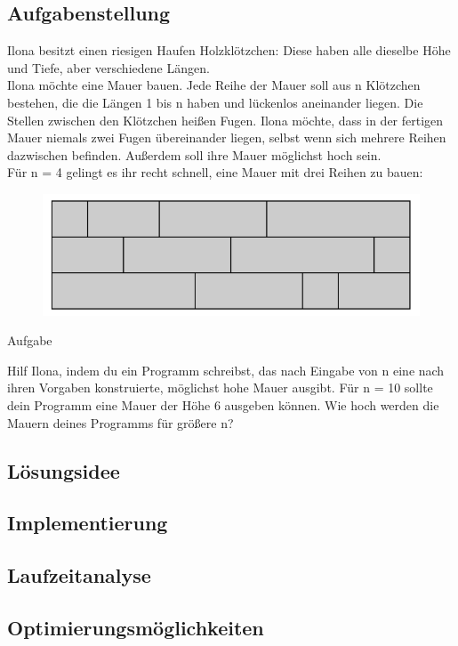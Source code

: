 \documentclass[a4paper,12pt]{article}			%
\begin{document}
\subsection{Aufgabenstellung}
Ilona besitzt einen riesigen Haufen Holzklötzchen: Diese haben alle dieselbe Höhe und Tiefe,
aber verschiedene Längen. \\
Ilona möchte eine Mauer bauen. Jede Reihe der Mauer soll aus n Klötzchen bestehen, die die
Längen 1 bis n haben und lückenlos aneinander liegen. Die Stellen zwischen den Klötzchen heißen
Fugen. Ilona möchte, dass in der fertigen Mauer niemals zwei Fugen übereinander liegen,
selbst wenn sich mehrere Reihen dazwischen befinden. Außerdem soll ihre Mauer möglichst
hoch sein. \\
Für n = 4 gelingt es ihr recht schnell, eine Mauer mit drei Reihen zu bauen:
\begin{figure}[H]
    \includegraphics[width=0.7\linewidth]{Bilder/Aufgabe1/Aufgabenstellung_BeispielMauer.png}
\end{figure}
\begin{large}
    Aufgabe \\
\end{large}
Hilf Ilona, indem du ein Programm schreibst, das nach Eingabe von n eine nach ihren Vorgaben
konstruierte, möglichst hohe Mauer ausgibt. Für n = 10 sollte dein Programm eine Mauer der
Höhe 6 ausgeben können. Wie hoch werden die Mauern deines Programms für größere n?

\subsection{Lösungsidee}

\subsection{Implementierung}

\subsection{Laufzeitanalyse}

\subsection{Optimierungsmöglichkeiten}
\end{document}
